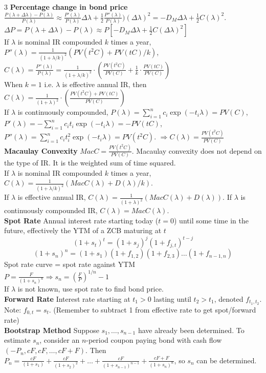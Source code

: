 \documentclass{article}
\begin{document}
{\begin{multicols*}{3}
\textbf{Percentage change in bond price} $\frac{P(\lambda+\Delta\lambda)-P(\lambda)}{P(\lambda)}\approx\frac{P'(\lambda)}{P(\lambda)}\Delta\lambda+\frac{1}{2}\frac{P''(\lambda)}{P(\lambda)})(\Delta\lambda)^2=-D_M\Delta\lambda+\frac{1}{2}C(\lambda)^2$. \\
$\Delta P=P(\lambda+\Delta\lambda)-P(\lambda)\approx P[-D_M\Delta\lambda+\frac{1}{2}C(\Delta\lambda)^2]$\\
If $\lambda$ is nominal IR compounded $k$ times a year, $P''(\lambda)=\frac{1}{(1+\lambda/k)^2}(PV(t^2C)+PV(tC)/k)$, \\
$C(\lambda)=\frac{P''(\lambda)}{P(\lambda)}=\frac{1}{(1+\lambda/k)^2}\cdot\left(\frac{PV(t^2C)}{PV(C)}+\frac{1}{k}\cdot\frac{PV(tC)}{PV(C)}\right)$\\
When $k=1$ i.e. $\lambda$ is effective annual IR, then $C(\lambda)=\frac{1}{(1+\lambda)^2}\cdot(\frac{PV(t^2C)+PV(tC)}{PV(C)})$\\
If $\lambda$ is continuously compounded, $P(\lambda)=\sum_{i=1}^nc_i\exp(-t_i\lambda)=PV(C)$, $P'(\lambda)=-\sum_{i=1}^nc_it_i\exp(-t_i\lambda)=-PV(tC)$, $P''(\lambda)=\sum_{i=1}^nc_it_i^2\exp(-t_i\lambda)=PV(t^2C)$. $\Rightarrow C(\lambda)=\frac{PV(t^2C)}{PV(C)}$\\
\textbf{Macaulay Convexity} $MacC=\frac{PV(t^2C)}{PV(C)}$. Macaulay convexity does not depend on the type of IR. It is the weighted sum of time squared. \\
If $\lambda$ is nominal IR compounded $k$ times a year, $C(\lambda)=\frac{1}{(1+\lambda/k)^2}(MacC(\lambda)+D(\lambda)/k)$.\\
If $\lambda$ is effective annual IR, $C(\lambda)=\frac{1}{(1+\lambda)^2}(MacC(\lambda)+D(\lambda))$. If $\lambda$ is continuously compounded IR, $C(\lambda)=MacC(\lambda)$.\\
\textbf{Spot Rate} Annual interest rate starting today ($t=0$) until some time in the future, effectively the YTM of a ZCB maturing at $t$
$$(1+s_t)^t=(1+s_j)^j(1+f_{j,t})^{t-j}$$
$$(1+s_n)^n=(1+s_1)(1+f_{1,2})(1+f_{2,3})\dots (1+f_{n-1,n})$$
Spot rate curve = spot rate against YTM\\
$P=\frac{F}{(1+s_n)^n}\Rightarrow s_n=(\frac{F}{P})^{1/n}-1$\\
If $\lambda$ is not known, use spot rate to find bond price.\\
\textbf{Forward Rate}
Interest rate starting at $t_1>0$ lasting until $t_2>t_1$, denoted $f_{t_1,t_2}$. Note: $f_{0,t}=s_t$. (Remember to subtract 1 from effective rate to get spot/forward rate)\\
\textbf{Bootstrap Method} Suppose $s_1,\dots,s_{n-1}$ have already been determined. To estimate $s_n$, consider an $n$-period coupon paying bond with cash flow $(-P_n,cF,cF,\dots,cF+F)$. Then $P_n=\frac{cF}{(1+s_1)}+\frac{cF}{(1+s_2)^2}+\dots+\frac{cF}{(1+s_{n-1})^{n-1}}+\frac{cF+F}{(1+s_n)^n}$, so $s_n$ can be determined.


\end{multicols*}}
\end{document}
